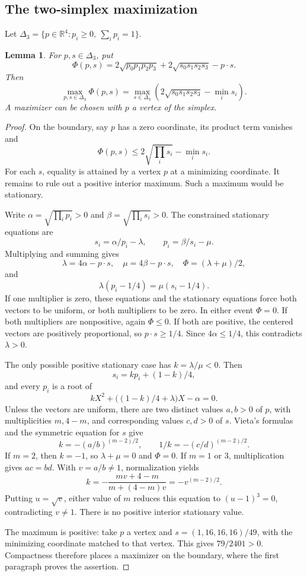 \documentclass[11pt,a4paper]{article}
\newtheorem{lemma}[theorem]{Lemma}
\newcommand{\R}{\mathbb R}
\begin{document}
\subsection{The two-simplex maximization}
Let $\Delta_3=\{p\in\R^4:p_i\ge0,\ \sum_i p_i=1\}$.
\begin{lemma}\label{lem:max}
For $p,s\in\Delta_3$, put
\[
\Phi(p,s)=2\sqrt{p_0p_1p_2p_3}+2\sqrt{s_0s_1s_2s_3}-p\cdot s.
\]
Then
\[
\max_{p,s\in\Delta_3}\Phi(p,s)
=\max_{s\in\Delta_3}\left(2\sqrt{s_0s_1s_2s_3}-\min_i s_i\right).
\]
A maximizer can be chosen with $p$ a vertex of the simplex.
\end{lemma}
\begin{proof}
On the boundary, say $p$ has a zero coordinate, its product term vanishes and
\[
\Phi(p,s)\le2\sqrt{\prod_i s_i}-\min_i s_i.
\]
For each $s$, equality is attained by a vertex $p$ at a minimizing coordinate. It remains to rule out a positive interior maximum. Such a maximum would be stationary.

Write $\alpha=\sqrt{\prod_i p_i}>0$ and $\beta=\sqrt{\prod_i s_i}>0$. The constrained stationary equations are
\[
s_i=\alpha/p_i-\lambda,\qquad p_i=\beta/s_i-\mu.
\]
Multiplying and summing gives
\[
\lambda=4\alpha-p\cdot s,\quad\mu=4\beta-p\cdot s,
\quad\Phi=(\lambda+\mu)/2,
\]
and
\[
\lambda(p_i-1/4)=\mu(s_i-1/4).
\]
If one multiplier is zero, these equations and the stationary equations force both vectors to be uniform, or both multipliers to be zero. In either event $\Phi=0$. If both multipliers are nonpositive, again $\Phi\le0$. If both are positive, the centered vectors are positively proportional, so $p\cdot s\ge1/4$. Since $4\alpha\le1/4$, this contradicts $\lambda>0$.

The only possible positive stationary case has $k=\lambda/\mu<0$. Then
\[
s_i=kp_i+(1-k)/4,
\]
and every $p_i$ is a root of
\[
kX^2+\bigl((1-k)/4+\lambda\bigr)X-\alpha=0.
\]
Unless the vectors are uniform, there are two distinct values $a,b>0$ of $p$, with multiplicities $m,4-m$, and corresponding values $c,d>0$ of $s$. Vieta's formulas and the symmetric equation for $s$ give
\[
k=-(a/b)^{(m-2)/2},\qquad 1/k=-(c/d)^{(m-2)/2}.
\]
If $m=2$, then $k=-1$, so $\lambda+\mu=0$ and $\Phi=0$. If $m=1$ or $3$, multiplication gives $ac=bd$. With $v=a/b\ne1$, normalization yields
\[
k=-\frac{mv+4-m}{m+(4-m)v}=-v^{(m-2)/2}.
\]
Putting $u=\sqrt v$, either value of $m$ reduces this equation to $(u-1)^3=0$, contradicting $v\ne1$. There is no positive interior stationary value.

The maximum is positive: take $p$ a vertex and $s=(1,16,16,16)/49$, with the minimizing coordinate matched to that vertex. This gives $79/2401>0$. Compactness therefore places a maximizer on the boundary, where the first paragraph proves the assertion.
\end{proof}
\end{document}
